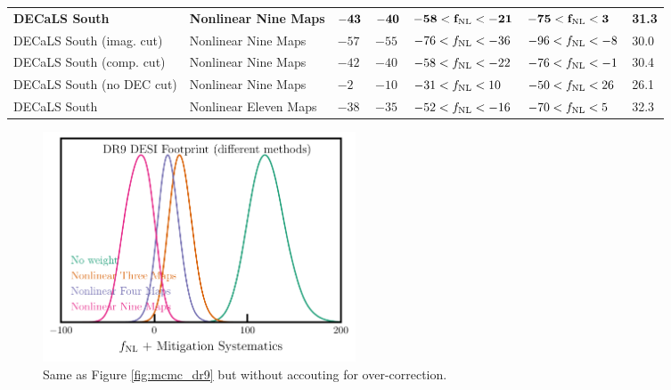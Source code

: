 \begin{table}
\begin{tabular}{lllllll}
\bf{DECaLS South} & \bf{Nonlinear Nine Maps}      & $   \bf{-43}$& $  \bf{-40}$& $   \bf{-58}<f_{\rm NL}<  \bf{-21}$& $   \bf{-75}<f_{\rm NL}<    \bf{ 3}$ &  \bf{31.3}\\
DECaLS South (imag. cut) & Nonlinear Nine Maps& $   -57$& $   -55$& $   -76<f_{\rm NL}<   -36$& $   -96<f_{\rm NL}<    -8$ &   30.0\\
DECaLS South (comp. cut) & Nonlinear Nine Maps& $   -42$& $   -40$& $   -58<f_{\rm NL}<   -22$& $   -76<f_{\rm NL}<    -1$ &   30.4\\
DECaLS South (no DEC cut) & Nonlinear Nine Maps& $    -2$& $   -10$& $   -31<f_{\rm NL}<    10$& $   -50<f_{\rm NL}<    26$ &   26.1\\
DECaLS South & Nonlinear Eleven Maps        & $   -38$& $   -35$& $   -52<f_{\rm NL}<   -16$& $   -70<f_{\rm NL}<     5$ &   32.3\\
   \hline
    \end{tabular}%
\end{table}



\begin{figure}
    \centering
    \includegraphics[width=0.45\textwidth]{figures/mcmc_dr9methods1dnoshift.pdf}
    \caption{Same as Figure \ref{fig:mcmc_dr9} but without accouting for over-correction. }
    \label{fig:mcmcdr9noshift}
\end{figure}


